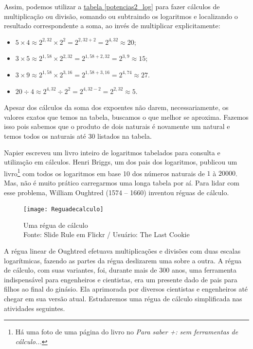 Assim, podemos utilizar a \hyperref[potencias2_log]{tabela \ref{potencias2_log}} para fazer cálculos de multiplicação ou divisão, somando ou subtraindo  os logaritmos e localizando o resultado correspondente a soma, ao invés de multiplicar explicitamente:
\begin{itemize}
 \item $5 \times 4 \approx 2^{2{,}32} \times 2^2 = 2^{2{,}32 + 2} = 2^{4{,}32} \approx 20$;
 \item $3 \times 5 \approx 2^{1{,}58} \times 2^{2{,}32} = 2^{1{,}58 + 2{,}32} = 2^{3{,}9} \approx 15$;
 \item $3 \times 9 \approx 2^{1{,}58} \times 2^{3{,}16} = 2^{1{,}58+3{,}16} = 2^{4{,}74} \approx 27$.
  \item $20 \div 4 \approx 2^{4{,}32} \div 2^{2} = 2^{4,32-2} = 2^{2{,}32} \approx 5$.
 \end{itemize}

Apesar dos cálculos da soma dos expoentes não darem, necessariamente, os valores exatos que temos na 
tabela, buscamos o que melhor se aproxima. Fazemos isso pois sabemos que o produto de dois naturais é novamente um 
natural e temos todos os naturais até 30 listados na tabela.


Napier escreveu um livro inteiro de logaritmos tabelados para consulta e utilização em cálculos. Henri Briggs, um dos pais dos logaritmos, publicou um livro\footnote{Há uma foto de uma página do livro no \textit{Para saber +: sem ferramentas de cálculo...}} com todos os logaritmos em base 10 dos números naturais de $1$ à $20000$. Mas, não é muito prático carregarmos uma longa tabela por aí. Para lidar com esse problema, William Oughtred  (1574 – 1660) inventou réguas de cálculo.

\begin{figure}
\centering
\texttt{[image: Reguadecalculo]}\\

\caption{Uma régua de cálculo \\ Fonte: Slide Rule em Flickr / Usuário: The Last Cookie}
\end{figure}

A régua linear de Oughtred efetuava multiplicações e divisões com duas escalas logarítmicas, fazendo as partes da régua deslizarem uma sobre a outra. A régua de cálculo, com suas variantes, foi, durante mais de 300  anos, uma ferramenta indispensável para engenheiros e cientistas, era um presente dado de pais para filhos ao final do 
ginásio. Ela aprimorada por diversos cientistas e engenheiros até chegar em sua versão atual. Estudaremos uma régua de cálculo simplificada nas atividades seguintes.


